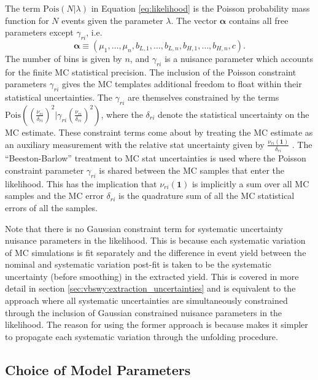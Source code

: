 The term $\text{Pois}(N|\lambda)$ in Equation \ref{eq:likelihood} is the Poisson probability mass function for $N$ events given the parameter $\lambda$. The vector $\boldsymbol{\alpha}$ contains all free parameters except $\gamma_{ri}$, i.e. 
\begin{equation}
  \boldsymbol{\alpha}\equiv(\mu_1,\ldots,\mu_n,b_{L,1},\ldots,b_{L,n},b_{H,1},\ldots,b_{H,n}, c).
\end{equation}
The number of bins is given by $n$, and $\gamma_{ri}$ is a nuisance parameter which accounts for the finite MC statistical precision. The inclusion of the Poisson constraint parameters $\gamma_{ri}$ gives the MC templates additional freedom to float within their statistical uncertainties. The $\gamma_{ri}$ are themselves constrained by the terms $\text{Pois}((\frac{\nu_{ri}}{\delta_{ri}})^2|\gamma_{ri}(\frac{\nu_{ri}}{\delta_{ri}})^2)$, where the $\delta_{ri}$ denote the statistical uncertainty on the MC estimate. These constraint terms come about by treating the MC estimate as an auxiliary measurement with the relative stat uncertainty given by $\frac{\nu_{ri}(\mathbf{1})}{\delta_{ri}}$ \cite{VBSWy:likelihood}. The ``Beeston-Barlow'' \cite{VBSWy:beestonbarlow} treatment to MC stat uncertainties is used where the Poisson constraint parameter $\gamma_{ri}$ is shared between the MC samples that enter the likelihood. This has the implication that $\nu_{ri}(\mathbf{1})$ is implicitly a sum over all MC samples and the MC error $\delta_{ri}$ is the quadrature sum of all the MC statistical errors of all the samples.

Note that there is no Gaussian constraint term for systematic uncertainty nuisance parameters in the likelihood. This is because each systematic variation of MC simulations is fit separately and the difference in event yield between the nominal and systematic variation post-fit is taken to be the systematic uncertainty (before smoothing) in the extracted yield. This is covered in more detail in section \ref{sec:vbswy:extraction_uncertainties} and is equivalent to the approach where all systematic uncertainties are simultaneously constrained through the inclusion of Gaussian constrained nuisance parameters in the likelihood. The reason for using the former approach is because makes it simpler to propagate each systematic variation through the unfolding procedure.

\subsection{Choice of Model Parameters}\label{sec:ngapjets_crosscheck}

